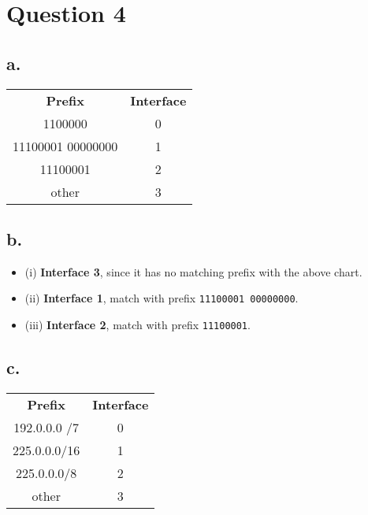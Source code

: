 \documentclass[12pt]{article}
\newcommand{\ilc}{\texttt}
\begin{document}
\section{Question 4}

\subsection{a.}

\begin{table}[H]
\center
\begin{tabular}{cc}
\textbf{Prefix}              & \textbf{Interface} \\
1100000             & 0         \\
11100001 00000000 & 1         \\
11100001           & 2         \\
other               & 3
\end{tabular}
\end{table}

\subsection{b.}
\begin{itemize}
    \item (i) \textbf{Interface 3}, since it has no matching prefix with the above chart.
    \item (ii) \textbf{Interface 1}, match with prefix \ilc{11100001 00000000}.
    \item (iii) \textbf{Interface 2}, match with prefix \ilc{11100001}.
\end{itemize}

\subsection{c.}
\begin{table}[H]
\center
\begin{tabular}{cc}
\textbf{Prefix}              & \textbf{Interface} \\
192.0.0.0 /7             & 0         \\
225.0.0.0/16 & 1         \\
225.0.0.0/8           & 2         \\
other               & 3
\end{tabular}
\end{table}



%
% 
% 
\end{document}
